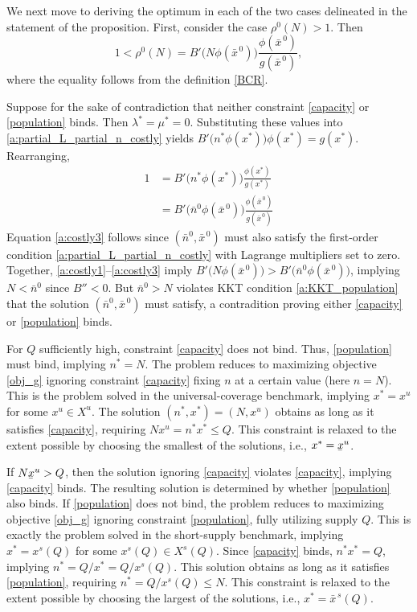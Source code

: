 \documentclass[12pt]{article}
\newcommand{\lowerbar}[1]{\underaccent{\bar}{#1}}
\newcommand{\efficacy}{\phi}
\newcommand{\general}{g}
\newcommand{\benefit}{B}
\newcommand{\ratio}{\rho^0\!}
\newcommand{\xuniv}{x^{u}}
\newcommand{\Xuniv}{X^{u}}
\newcommand{\xunivlbar}{\lowerbar{x}^{u}}
\newcommand{\xshort}{x^{s}}
\newcommand{\Xshort}{X^{s}}
\newcommand{\xshortbar}{\bar{x}^{\,s}}
\newcommand{\xnobar}{\bar{x}^{\,0}}
\newcommand{\nnobar}{\bar{n}^{0}}
\begin{document}
We next move to deriving the optimum in each of the two cases
delineated in the statement of the proposition. First, consider the
case $\ratio(N) > 1$. Then
\begin{equation}
\label{a:costly1}
1 < \ratio(N) = \benefit' \! \big( N \efficacy(\xnobar) \bigr)
\frac{\efficacy(\xnobar)}{\general(\xnobar)},
\end{equation}
where the equality follows from the definition \eqref{BCR}. 

Suppose for the sake of contradiction that neither constraint
\eqref{capacity} or \eqref{population} binds. Then $\lambda^* = \mu^*
= 0$. Substituting these values into
\eqref{a:partial_L_partial_n_costly} yields $\benefit' \! \bigl( n^*
\efficacy(x^*) \bigr) \efficacy(x^*) = \general(x^*)$. Rearranging,
\begin{align}
1 & = \benefit' \! \bigl( n^* \efficacy(x^*) \bigr) \frac{\efficacy(x^*)}{\general(x^*)} \label{a:costly2} \\
& = \benefit' \! \bigl( \nnobar \efficacy(\xnobar) \bigr) \frac{\efficacy(\xnobar)}{\general(\xnobar)} \label{a:costly3} 
\end{align} 
Equation \eqref{a:costly3} follows since $(\nnobar, \xnobar)$ must also satisfy the first-order condition \eqref{a:partial_L_partial_n_costly} with Lagrange multipliers set to zero.
Together,
\eqref{a:costly1}--\eqref{a:costly3} imply $\benefit' \! \bigl( N \efficacy(\xnobar) \bigr) > \benefit' \! \bigl( \nnobar \efficacy(\xnobar)
\bigr)$, implying $N < \nnobar$ since
$\benefit'' < 0$. But $\nnobar >
N$ violates KKT condition \eqref{a:KKT_population} that the solution $(\nnobar, \xnobar)$ must satisfy, a contradition
proving either \eqref{capacity} or \eqref{population} binds.

For $Q$ sufficiently high, constraint \eqref{capacity} does not
bind. Thus, \eqref{population} must bind, implying $n^* = N$. The
problem reduces to maximizing objective \eqref{obj_g} ignoring
constraint \eqref{capacity} fixing $n$ at a certain value (here $n =
N$). This is the problem solved in the universal-coverage benchmark,
implying $x^* = \xuniv$ for some $\xuniv \in \Xuniv$. The solution
$(n^*, x^*) = (N, \xuniv)$ obtains as long as it satisfies
\eqref{capacity}, requiring $N \xuniv = n^* x^* \leq Q$. This
constraint is relaxed to the extent possible by choosing the smallest
of the solutions, i.e., $x^* = \xunivlbar$.

If $N \xunivlbar > Q$, then the solution ignoring \eqref{capacity}
violates \eqref{capacity}, implying \eqref{capacity} binds. The
resulting solution is determined by whether \eqref{population} also
binds. If \eqref{population} does not bind, the problem reduces to
maximizing objective \eqref{obj_g} ignoring constraint
\eqref{population}, fully utilizing supply $Q$. This is exactly the
problem solved in the short-supply benchmark, implying $x^* =
\xshort\!(Q)$ for some $\xshort\!(Q) \in \Xshort\!(Q)$. Since
\eqref{capacity} binds, $n^* x^* = Q$, implying $n^* = Q / x^* = Q /
\xshort\!(Q)$. This solution obtains as long as it satisfies
\eqref{population}, requiring $n^* = Q / \xshort\!(Q) \leq N$. This
constraint is relaxed to the extent possible by choosing the largest
of the solutions, i.e., $x^* = \xshortbar\!(Q)$.
\end{document}
